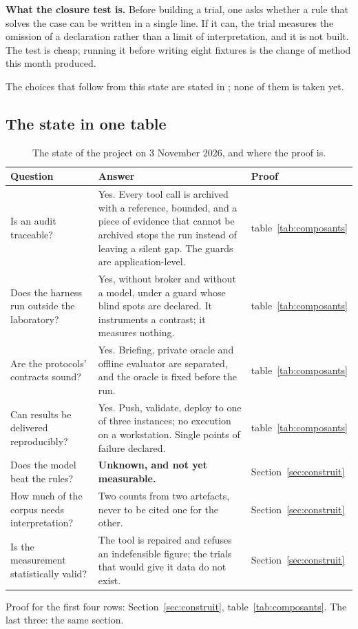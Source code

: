 \textbf{What the closure test is.} Before building a trial, one asks whether a rule
that solves the case can be written in a single line. If it can, the trial measures
the omission of a declaration rather than a limit of interpretation, and it is not
built. The test is cheap; running it before writing eight fixtures is the change of
method this month produced.

The choices that follow from this state are stated in
; none of them is taken yet.

\subsection{The state in one table}
\label{sec:table-etat}

\begin{table}[H]
\centering
\caption{The state of the project on 3 November 2026, and where the proof is.}
\label{tab:etat-chiffre}
\small
\begin{tabularx}{\linewidth}{@{}p{3.9cm}Yp{2.6cm}@{}}
\toprule
Question & Answer & \textbf{Proof} \\
\midrule
Is an audit traceable? & Yes. Every tool call is archived with a reference,
bounded, and a piece of evidence that cannot be archived stops the run instead of
leaving a silent gap. The guards are application-level. & table~\ref{tab:composants} \\
Does the harness run outside the laboratory? & Yes, without broker and without a
model, under a guard whose blind spots are declared. It instruments a contrast; it
measures nothing. & table~\ref{tab:composants} \\
Are the protocols' contracts sound? & Yes. Briefing, private oracle and offline
evaluator are separated, and the oracle is fixed before the run. & table~\ref{tab:composants} \\
Can results be delivered reproducibly? & Yes. Push, validate, deploy to one of
three instances; no execution on a workstation. Single points of failure declared.
& table~\ref{tab:composants} \\
Does the model beat the rules? & \textbf{Unknown, and not yet measurable.} & Section~\ref{sec:construit} \\
How much of the corpus needs interpretation? & Two counts from two artefacts,
never to be cited one for the other. & Section~\ref{sec:construit} \\
Is the measurement statistically valid? & The tool is repaired and refuses an
indefensible figure; the trials that would give it data do not exist. & Section~\ref{sec:construit} \\
\bottomrule
\end{tabularx}
\end{table}

{\footnotesize\color{muted}Proof for the first four rows: Section~\ref{sec:construit},
table~\ref{tab:composants}. The last three: the same section.}
